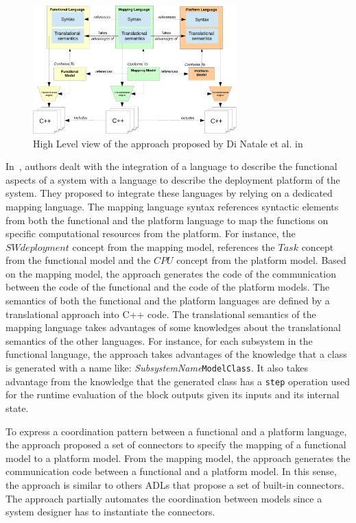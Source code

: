 \begin{figure}[ht!]
	\begin{center}
		\includegraphics[width=0.7\textwidth]{background/figs/diNatale}
		\caption{High Level view of the approach proposed by Di Natale et al. in~\cite{dinatale}}
		\label{fig:diNatale}
	\end{center}
\end{figure}

In~\cite{dinatale}, authors dealt with the integration of a language to describe the functional aspects of a system with a language to describe the deployment platform of the system. They proposed to integrate these languages by relying on a dedicated mapping language. The mapping language syntax references syntactic elements from both the functional and the platform language to map the functions on specific computational resources from the platform. For instance, the $SWdeployment$ concept from the mapping model, references the $Task$ concept from the functional model and the $CPU$ concept from the platform model. Based on the mapping model, the approach generates the code of the communication between the code of the functional and the code of the platform models. The semantics of both the functional and the platform languages are defined by a translational approach into C++ code. The translational semantics of the mapping language takes advantages of some knowledges about the translational semantics of the other languages. For instance, for each subsystem in the functional language, the approach takes advantages of the knowledge that a class is generated with a name like: \emph{SubsystemName}\texttt{ModelClass}. It also takes advantage from the knowledge that the generated class has a \texttt{step} operation used for the runtime evaluation of the block outputs given its inputs and its internal state. 

To express a coordination pattern between a functional and a platform language, the approach proposed a set of connectors to specify the mapping of a functional model to a platform model. From the mapping model, the approach generates the communication code between a functional and a platform model. In this sense, the approach is similar to others ADLs that propose a set of built-in connectors. The approach partially automates the coordination between models since a system designer has to instantiate the connectors.  

